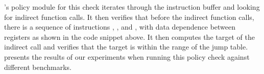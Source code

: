 \tool's policy module for this check iterates through the instruction buffer
and looking for indirect function calls. It then verifies that before the
indirect function calls, there is a sequence of instructions ,
,  and , with data dependence between registers
as shown in the code snippet above. It then computes the target of the indirect
call and verifies that the target is within the range of the jump table.
 presents the results of our experiments
when running this policy check against different benchmarks.
